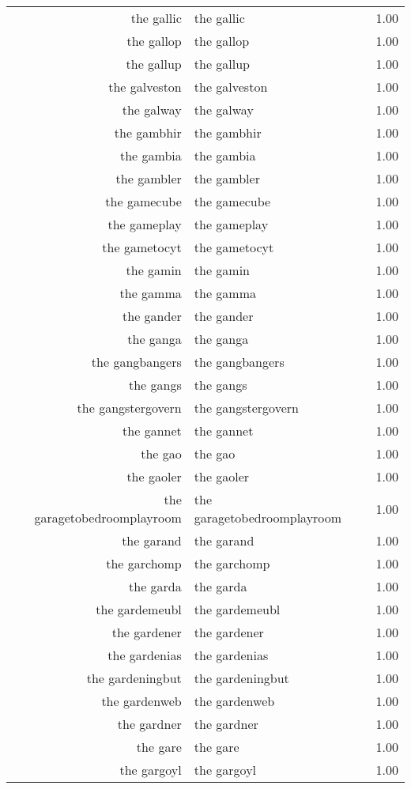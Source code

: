 \begin{table}[ht]
\begin{tabular}{rlr}
  the gallic & the gallic & 1.00 \\ 
  the gallop & the gallop & 1.00 \\ 
  the gallup & the gallup & 1.00 \\ 
  the galveston & the galveston & 1.00 \\ 
  the galway & the galway & 1.00 \\ 
  the gambhir & the gambhir & 1.00 \\ 
  the gambia & the gambia & 1.00 \\ 
  the gambler & the gambler & 1.00 \\ 
  the gamecube & the gamecube & 1.00 \\ 
  the gameplay & the gameplay & 1.00 \\ 
  the gametocyt & the gametocyt & 1.00 \\ 
  the gamin & the gamin & 1.00 \\ 
  the gamma & the gamma & 1.00 \\ 
  the gander & the gander & 1.00 \\ 
  the ganga & the ganga & 1.00 \\ 
  the gangbangers & the gangbangers & 1.00 \\ 
  the gangs & the gangs & 1.00 \\ 
  the gangstergovern & the gangstergovern & 1.00 \\ 
  the gannet & the gannet & 1.00 \\ 
  the gao & the gao & 1.00 \\ 
  the gaoler & the gaoler & 1.00 \\ 
  the garagetobedroomplayroom & the garagetobedroomplayroom & 1.00 \\ 
  the garand & the garand & 1.00 \\ 
  the garchomp & the garchomp & 1.00 \\ 
  the garda & the garda & 1.00 \\ 
  the gardemeubl & the gardemeubl & 1.00 \\ 
  the gardener & the gardener & 1.00 \\ 
  the gardenias & the gardenias & 1.00 \\ 
  the gardeningbut & the gardeningbut & 1.00 \\ 
  the gardenweb & the gardenweb & 1.00 \\ 
  the gardner & the gardner & 1.00 \\ 
  the gare & the gare & 1.00 \\ 
  the gargoyl & the gargoyl & 1.00 \\ 

\end{tabular}
\end{table}
